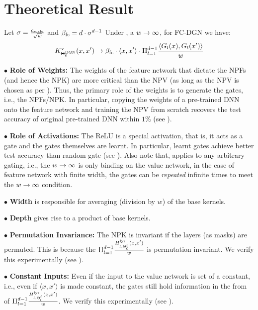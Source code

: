 \section{Theoretical Result}\label{sec:fc}
\begin{theorem}\label{th:main} Let $\sigma=\frac{c_{\text{scale}}}{\sqrt{w}}$ and $\beta_{\text{fc}}= d\cdot\sigma^{d-1} $ Under , a $w\rightarrow\infty$, for FC-DGN we have: 
\begin{align*}
K^{\text{v}}_{\Theta^{\text{DGN}}_0}(x,x') \rightarrow \beta_{\text{fc}} \cdot\langle  x,x'\rangle \cdot \Pi_{l=1}^{d-1} \frac{\langle G_l(x),G_l(x')\rangle}w
\end{align*}
\end{theorem}
$\bullet$ \textbf{Role of Weights:}  The weights of the feature network that dictate the NPFs (and hence the NPK) are more critical than the NPV (as long as the NPV is chosen as per ). Thus, the primary role of the weights is to generate the gates, i.e., the NPFs/NPK. In particular, copying the weights of a pre-trained DNN onto the feature network and training the NPV from scratch recovers the test accuracy of original pre-trained DNN within $1\%$ (see ). 

$\bullet$ \textbf{Role of Activations:} The ReLU is a special activation, that is, it acts as a gate and the gates themselves are learnt. In particular, learnt gates achieve better test accuracy than random gate (see ). Also note that,  applies to any arbitrary gating, i.e., the $w\rightarrow\infty$ is only binding on the value network, in the case of feature network with finite width, the gates can be \emph{repeated} infinite times to meet the $w\rightarrow\infty$ condition. 

$\bullet$ \textbf{Width} is responsible for averaging (division by $w$) of the base kernels.

$\bullet$ \textbf{Depth} gives rise to a product of base kernels. 

$\bullet$ \textbf{Permutation Invariance:} The NPK is invariant if the layers (as masks) are permuted. This is because the $\Pi_{l=1}^{d-1} \frac{H^{\text{lyr}}_{l,\Theta^{\textrm{f}}_0}(x,x')}{w}$ is permutation invariant. We verify this experimentally (see ).

$\bullet$ \textbf{Constant Inputs:} Even if the input to the value network is set of a constant, i.e., even if $\langle x,x'\rangle$ is made constant, the gates still hold information in the from of $\Pi_{l=1}^{d-1} \frac{H^{\text{lyr}}_{l,\Theta^{\textrm{f}}_0}(x,x')}{w}$. We verify this experimentally (see ).
